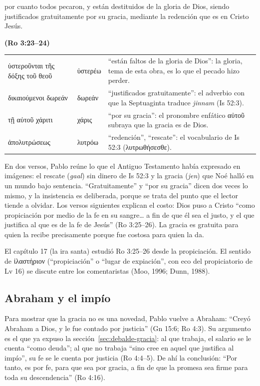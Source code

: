 \documentclass[11pt,letterpaper]{article}
\newcommand{\grc}[1]{\foreignlanguage{ancientgreek}{#1}}
\newcommand{\fuente}[1]{\par\hfill{\upshape\bfseries\small\textcolor{azul}{#1}}}
\begin{document}
\begin{cita}por cuanto todos pecaron, y están destituidos de la gloria de Dios, siendo justificados gratuitamente por su gracia, mediante la redención que es en Cristo Jesús.\fuente{(Ro 3:23--24)}\end{cita}

\begin{filologia}[Ro 3:23--24]
\begin{tabular}{@{}L{3.6cm}L{1.6cm}L{9.6cm}@{}}
\grc{ὑστεροῦνται τῆς δόξης τοῦ θεοῦ} & \grc{ὑστερέω} & ``están faltos de la gloria de Dios'': la gloria, tema de esta obra, es lo que el pecado hizo perder. \\[2pt]
\grc{δικαιούμενοι δωρεάν} & \grc{δωρεάν} & ``justificados gratuitamente'': el adverbio con que la Septuaginta traduce \emph{jinnam} (Is 52:3). \\[2pt]
\grc{τῇ αὐτοῦ χάριτι} & \grc{χάρις} & ``por su gracia'': el pronombre enfático \grc{αὐτοῦ} subraya que la gracia es de Dios. \\[2pt]
\grc{ἀπολυτρώσεως} & \grc{λυτρόω} & ``redención'', ``rescate'': el vocabulario de Is 52:3 (\grc{λυτρωθήσεσθε}). \\
\end{tabular}
\end{filologia}

En dos versos, Pablo reúne lo que el Antiguo Testamento había expresado en imágenes: el rescate (\emph{gaal}) sin dinero de Is 52:3 y la gracia (\emph{jen}) que Noé halló en un mundo bajo sentencia. ``Gratuitamente'' y ``por su gracia'' dicen dos veces lo mismo, y la insistencia es deliberada, porque se trata del punto que el lector tiende a olvidar. Los versos siguientes explican el costo: Dios puso a Cristo ``como propiciación por medio de la fe en su sangre\ldots{} a fin de que él sea el justo, y el que justifica al que es de la fe de Jesús'' (Ro 3:25--26). La gracia es gratuita para quien la recibe precisamente porque fue costosa para quien la da.

\begin{nota}[Precisión]
El capítulo 17 (la ira santa) estudió Ro 3:25--26 desde la propiciación. El sentido de \grc{ἱλαστήριον} (``propiciación'' o ``lugar de expiación'', con eco del propiciatorio de Lv 16) se discute entre los comentaristas (Moo, 1996; Dunn, 1988).
\end{nota}

\subsection{Abraham y el impío}
Para mostrar que la gracia no es una novedad, Pablo vuelve a Abraham: ``Creyó Abraham a Dios, y le fue contado por justicia'' (Gn 15:6; Ro 4:3). Su argumento es el que ya expuso la sección~\ref{sec:debalde-gracia}: al que trabaja, el salario se le cuenta ``como deuda''; al que no trabaja ``sino cree en aquel que justifica al impío'', su fe se le cuenta por justicia (Ro 4:4--5). De ahí la conclusión: ``Por tanto, es por fe, para que sea por gracia, a fin de que la promesa sea firme para toda su descendencia'' (Ro 4:16).
\end{document}
